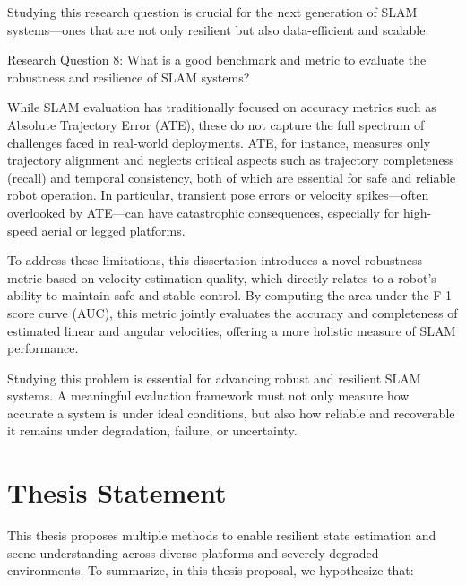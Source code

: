 Studying this research question is crucial for the next generation of SLAM systems—ones that are not only resilient but also data-efficient and scalable.

\begin{framed} Research Question 8: What is a good benchmark and metric to evaluate the robustness and resilience of SLAM systems? \end{framed}

While SLAM evaluation has traditionally focused on accuracy metrics such as Absolute Trajectory Error (ATE), these do not capture the full spectrum of challenges faced in real-world deployments. ATE, for instance, measures only trajectory alignment and neglects critical aspects such as trajectory completeness (recall) and temporal consistency, both of which are essential for safe and reliable robot operation. In particular, transient pose errors or velocity spikes—often overlooked by ATE—can have catastrophic consequences, especially for high-speed aerial or legged platforms.

To address these limitations, this dissertation introduces a novel robustness metric based on velocity estimation quality, which directly relates to a robot’s ability to maintain safe and stable control. By computing the area under the F-1 score curve (AUC), this metric jointly evaluates the accuracy and completeness of estimated linear and angular velocities, offering a more holistic measure of SLAM performance. 

Studying this problem is essential for advancing robust and resilient SLAM systems. A meaningful evaluation framework must not only measure how accurate a system is under ideal conditions, but also how reliable and recoverable it remains under degradation, failure, or uncertainty.


\section{Thesis Statement}
\label{sec:thesis_statement}
This thesis proposes multiple methods to enable resilient state estimation and scene understanding across diverse platforms and severely degraded environments. To summarize, in this thesis proposal, we hypothesize that: 



